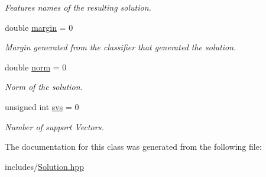 \begin{DoxyCompactItemize}
\begin{DoxyCompactList}\small\item\em Features names of the resulting solution. \end{DoxyCompactList}\item 
\mbox{\label{class_solution_a3580af26a22d86e44df701f654165e0f}} 
double \mbox{\hyperlink{class_solution_a3580af26a22d86e44df701f654165e0f}{margin}} = 0
\begin{DoxyCompactList}\small\item\em Margin generated from the classifier that generated the solution. \end{DoxyCompactList}\item 
\mbox{\label{class_solution_acbc0610c1c2e2d7bb5c39af33b7eb99c}} 
double \mbox{\hyperlink{class_solution_acbc0610c1c2e2d7bb5c39af33b7eb99c}{norm}} = 0
\begin{DoxyCompactList}\small\item\em Norm of the solution. \end{DoxyCompactList}\item 
\mbox{\label{class_solution_ae9f64bc0520b7c42d3c395f48748eca5}} 
unsigned int \mbox{\hyperlink{class_solution_ae9f64bc0520b7c42d3c395f48748eca5}{svs}} = 0
\begin{DoxyCompactList}\small\item\em Number of support Vectors. \end{DoxyCompactList}\end{DoxyCompactItemize}


The documentation for this class was generated from the following file\+:\begin{DoxyCompactItemize}
\item 
includes/\mbox{\hyperlink{_solution_8hpp}{Solution.\+hpp}}\end{DoxyCompactItemize}
